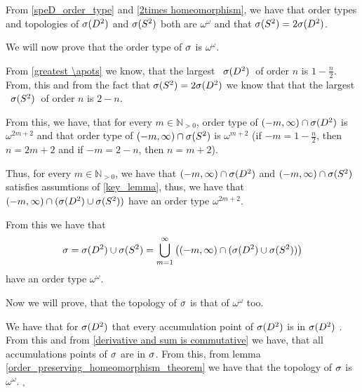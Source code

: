 From \ref{speD_order_type} and \ref{2times homeomorphism}, we have that order types and 
topologies of ${{\sigma}(D^2)}$ and $\speS$ both are $\omega^\omega$ and that ${{\sigma}(S^2)} = 2{{\sigma}(D^2)}$.  

We will now prove that the order type of ${\sigma}$ is $\omega^\omega$.

From \ref{greatest \apots} we know, that the largest \apots\ ${{\sigma}(D^2)}$\ of order $n$ is 
$1-\frac{n}{2}$. From, this and from the fact that ${{\sigma}(S^2)} = 2{{\sigma}(D^2)}$ we know that 
that the largest \apots\ $\speS$\ of order $n$ is 
$2-n$. 

From this, we have, that for every $m \in \mathbb{N}_{>0}$, order type of 
$(-m, \infty) \cap {{\sigma}(D^2)}$ is $\omega^{2m+2}$ and that order type 
of $(-m, \infty) \cap {{\sigma}(S^2)}$ is $\omega^{m+2}$ (if $-m = 1-\frac{n}{2}$, then 
$n = 2m + 2$ and 
if $-m = 2 - n$, then $n = m + 2$). 

Thus, for every $m \in \mathbb{N}_{>0}$, we have that $(-m, \infty) \cap {{\sigma}(D^2)}$ and 
$(-m, \infty) \cap {{\sigma}(S^2)}$ satisfies assumtions of \ref{key_lemma}, thus, we have that 
$(-m, \infty) \cap ({{\sigma}(D^2)}\cup{{\sigma}(S^2)})$ have an order type $\omega^{2m+2}$. 

From this we have that 
\begin{equation}
{\sigma} = {{\sigma}(D^2)} \cup {{\sigma}(S^2)} = 
\bigcup\limits_{m=1}^\infty \left( (-m, \infty) \cap ({{\sigma}(D^2)}\cup{{\sigma}(S^2)}) \right)
\end{equation} 
have an order type $\omega^\omega$.

Now we will prove, that the topology of ${\sigma}$ is that of $\omega^\omega$ too.

We have that for ${{\sigma}(D^2)}$ \rba{$\speS$} that every accumulation point of 
${{\sigma}(D^2)}$ \rba{$\speS$} is in ${{\sigma}(D^2)}$ \rba{$\speS$}. From this and from 
\ref{derivative and sum is commutative} we have, that all accumulations points of ${\sigma}$ 
are in ${\sigma}$. From this, from lemma \ref{order_preserving_homeomorphism_theorem} we have 
that the topology of ${\sigma}$ is $\omega^\omega$. $_\square$ 




